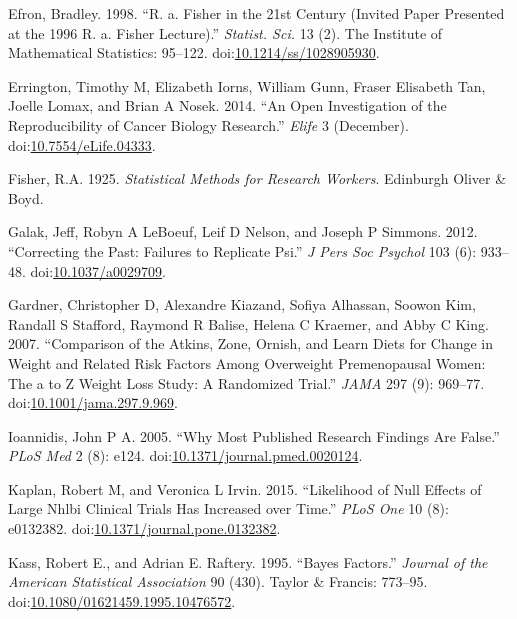 \documentclass[]{book}
\theoremstyle{definition}
\theoremstyle{definition}
\theoremstyle{definition}
\theoremstyle{remark}
\begin{document}
\hypertarget{ref-efron1998}{}
Efron, Bradley. 1998. ``R. a. Fisher in the 21st Century (Invited Paper
Presented at the 1996 R. a. Fisher Lecture).'' \emph{Statist. Sci.} 13
(2). The Institute of Mathematical Statistics: 95--122.
doi:\href{https://doi.org/10.1214/ss/1028905930}{10.1214/ss/1028905930}.

\hypertarget{ref-erri:iorn:gunn:2014}{}
Errington, Timothy M, Elizabeth Iorns, William Gunn, Fraser Elisabeth
Tan, Joelle Lomax, and Brian A Nosek. 2014. ``An Open Investigation of
the Reproducibility of Cancer Biology Research.'' \emph{Elife} 3
(December).
doi:\href{https://doi.org/10.7554/eLife.04333}{10.7554/eLife.04333}.

\hypertarget{ref-fisher1925statistical}{}
Fisher, R.A. 1925. \emph{Statistical Methods for Research Workers}.
Edinburgh Oliver \& Boyd.

\hypertarget{ref-gala:lebo:nels:2012}{}
Galak, Jeff, Robyn A LeBoeuf, Leif D Nelson, and Joseph P Simmons. 2012.
``Correcting the Past: Failures to Replicate Psi.'' \emph{J Pers Soc
Psychol} 103 (6): 933--48.
doi:\href{https://doi.org/10.1037/a0029709}{10.1037/a0029709}.

\hypertarget{ref-gard:kiaz:alha:2007}{}
Gardner, Christopher D, Alexandre Kiazand, Sofiya Alhassan, Soowon Kim,
Randall S Stafford, Raymond R Balise, Helena C Kraemer, and Abby C King.
2007. ``Comparison of the Atkins, Zone, Ornish, and Learn Diets for
Change in Weight and Related Risk Factors Among Overweight Premenopausal
Women: The a to Z Weight Loss Study: A Randomized Trial.'' \emph{JAMA}
297 (9): 969--77.
doi:\href{https://doi.org/10.1001/jama.297.9.969}{10.1001/jama.297.9.969}.

\hypertarget{ref-ioan:2005}{}
Ioannidis, John P A. 2005. ``Why Most Published Research Findings Are
False.'' \emph{PLoS Med} 2 (8): e124.
doi:\href{https://doi.org/10.1371/journal.pmed.0020124}{10.1371/journal.pmed.0020124}.

\hypertarget{ref-kapl:irvi:2015}{}
Kaplan, Robert M, and Veronica L Irvin. 2015. ``Likelihood of Null
Effects of Large Nhlbi Clinical Trials Has Increased over Time.''
\emph{PLoS One} 10 (8): e0132382.
doi:\href{https://doi.org/10.1371/journal.pone.0132382}{10.1371/journal.pone.0132382}.

\hypertarget{ref-kass:raff:1995}{}
Kass, Robert E., and Adrian E. Raftery. 1995. ``Bayes Factors.''
\emph{Journal of the American Statistical Association} 90 (430). Taylor
\& Francis: 773--95.
doi:\href{https://doi.org/10.1080/01621459.1995.10476572}{10.1080/01621459.1995.10476572}.
\end{document}
